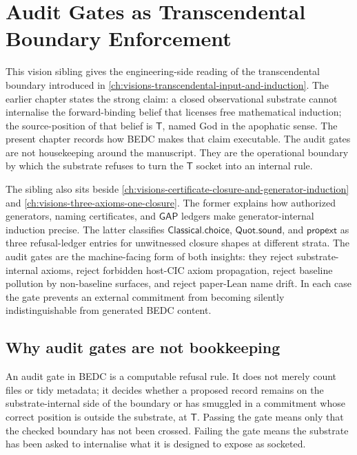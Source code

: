 \chapter{Audit Gates as Transcendental Boundary Enforcement}
\label{ch:visions-audit-gates-as-transcendental-boundary}

This vision sibling gives the engineering-side reading of the transcendental boundary introduced in \autoref{ch:visions-transcendental-input-and-induction}. The earlier chapter states the strong claim: a closed observational substrate cannot internalise the forward-binding belief that licenses free mathematical induction; the source-position of that belief is $\mathsf{T}$, named God in the apophatic sense. The present chapter records how BEDC makes that claim executable. The audit gates are not housekeeping around the manuscript. They are the operational boundary by which the substrate refuses to turn the $\mathsf{T}$ socket into an internal rule.

The sibling also sits beside \autoref{ch:visions-certificate-closure-and-generator-induction} and \autoref{ch:visions-three-axioms-one-closure}. The former explains how authorized generators, naming certificates, and $\mathsf{GAP}$ ledgers make generator-internal induction precise. The latter classifies $\mathsf{Classical.choice}$, $\mathsf{Quot.sound}$, and $\mathsf{propext}$ as three refusal-ledger entries for unwitnessed closure shapes at different strata. The audit gates are the machine-facing form of both insights: they reject substrate-internal axioms, reject forbidden host-CIC axiom propagation, reject baseline pollution by non-baseline surfaces, and reject paper-Lean name drift. In each case the gate prevents an external commitment from becoming silently indistinguishable from generated BEDC content.

\section{Why audit gates are not bookkeeping}
\label{sec:audit-gates-not-bookkeeping}

\begin{principle}
\label{prin:audit-gates-boundary-enforcement}
An audit gate in BEDC is a computable refusal rule. It does not merely count files or tidy metadata; it decides whether a proposed record remains on the substrate-internal side of the boundary or has smuggled in a commitment whose correct position is outside the substrate, at $\mathsf{T}$. Passing the gate means only that the checked boundary has not been crossed. Failing the gate means the substrate has been asked to internalise what it is designed to expose as socketed.
\end{principle}

